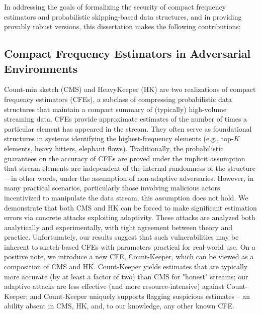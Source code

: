 In addressing the goals of formalizing the security of compact frequency estimators and probabilistic skipping-based data structures, and in providing provably robust versions, this dissertation makes the following contributions:

\subsection{Compact Frequency Estimators in Adversarial Environments} Count-min sketch (CMS) and HeavyKeeper (HK) are two realizations of compact frequency estimators (CFEs), a subclass of compressing probabilistic data structures that maintain a compact summary of (typically) high-volume streaming data. CFEs provide approximate estimates of the number of times a particular element has appeared in the stream. They often serve as foundational structures in systems identifying the highest-frequency elements (e.g., top-$K$ elements, heavy hitters, elephant flows). Traditionally, the probabilistic guarantees on the accuracy of CFEs are proved under the implicit assumption that stream elements are independent of the internal randomness of the structure—in other words, under the assumption of non-adaptive adversaries. However, in many practical scenarios, particularly those involving malicious actors incentivized to manipulate the data stream, this assumption does not hold. We demonstrate that both CMS and HK can be forced to make significant estimation errors via concrete attacks exploiting adaptivity. These attacks are analyzed both analytically and experimentally, with tight agreement between theory and practice. Unfortunately, our results suggest that such vulnerabilities may be inherent to sketch-based CFEs with parameters practical for real-world use. On a positive note, we introduce a new CFE, Count-Keeper, which can be viewed as a composition of CMS and HK. Count-Keeper yields estimates that are typically more accurate (by at least a factor of two) than CMS for "honest" streams; our adaptive attacks are less effective (and more resource-intensive) against Count-Keeper; and Count-Keeper uniquely supports flagging suspicious estimates -- an ability absent in CMS, HK, and, to our knowledge, any other known CFE.

